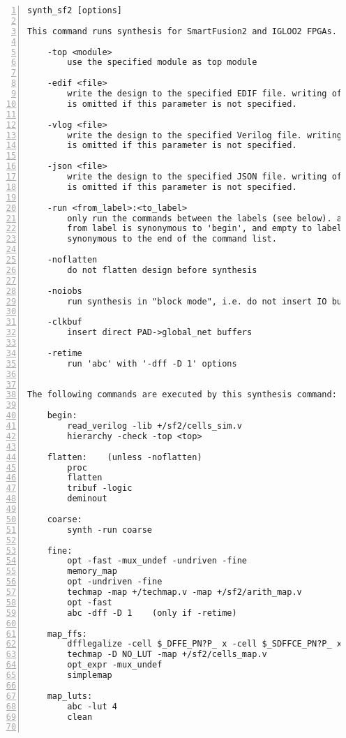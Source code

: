 \begin{lstlisting}[numbers=left,frame=single]
    synth_sf2 [options]

This command runs synthesis for SmartFusion2 and IGLOO2 FPGAs.

    -top <module>
        use the specified module as top module

    -edif <file>
        write the design to the specified EDIF file. writing of an output file
        is omitted if this parameter is not specified.

    -vlog <file>
        write the design to the specified Verilog file. writing of an output file
        is omitted if this parameter is not specified.

    -json <file>
        write the design to the specified JSON file. writing of an output file
        is omitted if this parameter is not specified.

    -run <from_label>:<to_label>
        only run the commands between the labels (see below). an empty
        from label is synonymous to 'begin', and empty to label is
        synonymous to the end of the command list.

    -noflatten
        do not flatten design before synthesis

    -noiobs
        run synthesis in "block mode", i.e. do not insert IO buffers

    -clkbuf
        insert direct PAD->global_net buffers

    -retime
        run 'abc' with '-dff -D 1' options


The following commands are executed by this synthesis command:

    begin:
        read_verilog -lib +/sf2/cells_sim.v
        hierarchy -check -top <top>

    flatten:    (unless -noflatten)
        proc
        flatten
        tribuf -logic
        deminout

    coarse:
        synth -run coarse

    fine:
        opt -fast -mux_undef -undriven -fine
        memory_map
        opt -undriven -fine
        techmap -map +/techmap.v -map +/sf2/arith_map.v
        opt -fast
        abc -dff -D 1    (only if -retime)

    map_ffs:
        dfflegalize -cell $_DFFE_PN?P_ x -cell $_SDFFCE_PN?P_ x -cell $_DLATCH_PN?_ x
        techmap -D NO_LUT -map +/sf2/cells_map.v
        opt_expr -mux_undef
        simplemap

    map_luts:
        abc -lut 4
        clean


\end{lstlisting}
